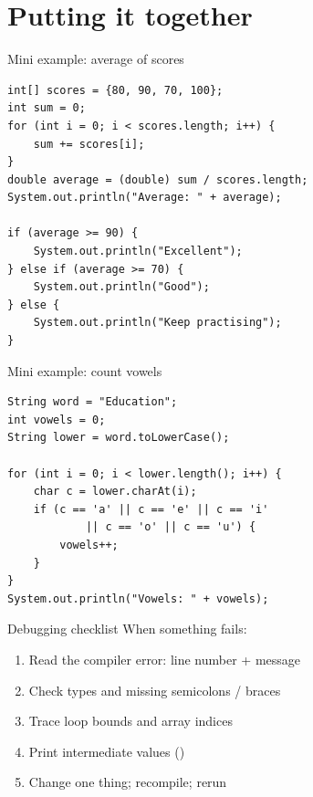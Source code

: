 \documentclass[aspectratio=169,11pt]{beamer}
\begin{document}
    \section{Putting it together}

    \begin{frame}[fragile]{Mini example: average of scores}
        \begin{lstlisting}
int[] scores = {80, 90, 70, 100};
int sum = 0;
for (int i = 0; i < scores.length; i++) {
    sum += scores[i];
}
double average = (double) sum / scores.length;
System.out.println("Average: " + average);

if (average >= 90) {
    System.out.println("Excellent");
} else if (average >= 70) {
    System.out.println("Good");
} else {
    System.out.println("Keep practising");
}
        \end{lstlisting}
    \end{frame}

    \begin{frame}[fragile]{Mini example: count vowels}
        \begin{lstlisting}
String word = "Education";
int vowels = 0;
String lower = word.toLowerCase();

for (int i = 0; i < lower.length(); i++) {
    char c = lower.charAt(i);
    if (c == 'a' || c == 'e' || c == 'i'
            || c == 'o' || c == 'u') {
        vowels++;
    }
}
System.out.println("Vowels: " + vowels);
        \end{lstlisting}
    \end{frame}

    \begin{frame}{Debugging checklist}
        When something fails:
        \begin{enumerate}
            \item Read the compiler error: line number + message
            \item Check types and missing semicolons / braces
            \item Trace loop bounds and array indices
            \item Print intermediate values ()
            \item Change one thing; recompile; rerun
        \end{enumerate}
    \end{frame}
\end{document}
